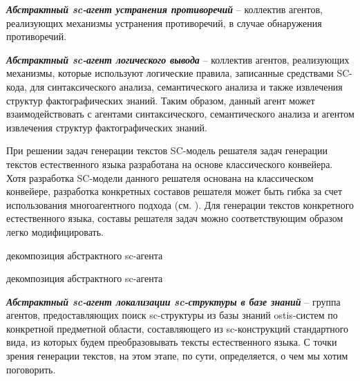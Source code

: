 \textit{\textbf{Абстрактный sc-агент устранения противоречий}} -- коллектив агентов, реализующих механизмы устранения противоречий, в случае обнаружения противоречий. 

\textit{\textbf{Абстрактный sc-агент логического вывода}} -- коллектив агентов, реализующих механизмы, которые используют логические правила, записанные средствами SC-кода, для синтаксического анализа, семантического анализа и также извлечения структур фактографических знаний. Таким образом, данный агент может взаимодействовать с агентами синтаксического, семантического анализа и агентом извлечения структур фактографических знаний.

При решении задач генерации текстов SC-модель решателя задач генерации текстов естественного языка разработана на основе классического конвейера. Хотя разработка SC-модели данного решателя основана на классическом конвейере, разработка конкретных составов решателя может быть гибка за счет использования многоагентного подхода (см. ). Для генерации текстов конкретного естественного языка, составы решателя задач можно соответствующим образом легко модифицировать.
\begin{SCn}
	\begin{scnrelfromset}{декомпозиция абстрактного sc-агента}
	\end{scnrelfromset}
\end{SCn}

\begin{SCn}
	\begin{scnrelfromset}{декомпозиция абстрактного sc-агента}
	\end{scnrelfromset}
\end{SCn}

\textit{\textbf{Абстрактный sc-агент локализации sc-структуры в базе знаний}} -- группа агентов, предоставляющих поиск sc-структуры из базы знаний ostis-систем по конкретной предметной области, составляющего из sc-конструкций стандартного вида, из которых будем преобразовывать тексты естественного языка. С точки зрения генерации текстов, на этом этапе, по сути, определяется, о чем мы хотим поговорить. 


